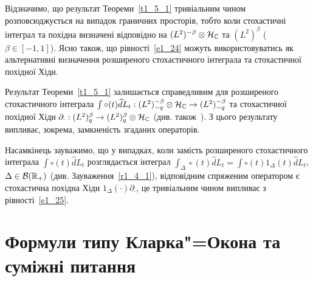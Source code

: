 Відзначимо, що результат Теореми~\ref{t1_5_1} тривіальним чином розповсюджується на випадок
граничних просторів, тобто коли стохастичні інтеграл та похідна визначені відповідно на
$(L^2)^{-\beta}\otimes\mathcal{H}_{\mathbb{C}}$ та $(L^2)^\beta$ ($\beta\in [-1,1]$).
Ясно також, що рівності~\eqref{e1_24} можуть використовуватись як альтернативні визначення
розширеного стохастичного інтеграла та стохастичної похідної Хіди.

\begin{subremark}
Результат Теореми~\ref{t1_5_1} залишається справедливим для розширеного стохастичного інтеграла
$\int\circ (t)\widehat d L_t:
(L^2)^{-\beta}_{-q}\otimes\mathcal{H}_{\mathbb{C}}\to (L^2)^{-\beta}_{-q}$ та стохастичної
похідної Хіди $\partial_\cdot : (L^2)^\beta_q\to (L^2)^\beta_q\otimes\mathcal{H}_{\mathbb{C}}$
\cite{K13_2} (див. також~\cite{K13}). З цього результату випливає, зокрема, замкненість
згаданих операторів.
\end{subremark}

Насамкінець зауважимо, що у випадках, коли замість розширеного стохастичного інтеграла
$\int\circ (t)\widehat d L_t$ розглядається інтеграл $\int_\Delta\circ (t)\widehat d L_t
=\int\circ (t)1_\Delta (t)\widehat dL_t$, $\Delta\in\mathcal B(\mathbb{R}_+)$ (див.
Зауваження~\ref{r1_4_1}), відповідним спряженим оператором є стохастична похідна Хіди
$1_\Delta (\cdot)\partial_\cdot$, це тривіальним чином випливає з рівності~\eqref{e1_25}.


\section{Формули типу Кларка"=Окона та суміжні питання}

